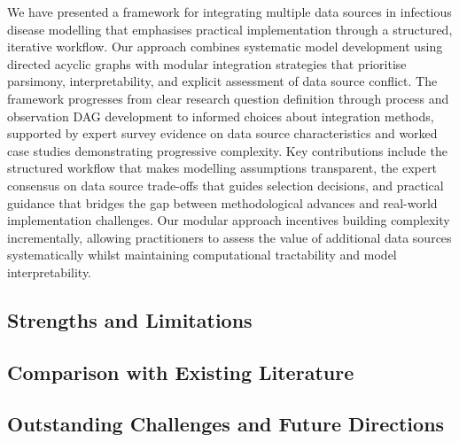 \documentclass{article}
\begin{document}
We have presented a framework for integrating multiple data sources in infectious disease modelling that emphasises practical implementation through a structured, iterative workflow.
Our approach combines systematic model development using directed acyclic graphs with modular integration strategies that prioritise parsimony, interpretability, and explicit assessment of data source conflict.
The framework progresses from clear research question definition through process and observation DAG development to informed choices about integration methods, supported by expert survey evidence on data source characteristics and worked case studies demonstrating progressive complexity.
Key contributions include the structured workflow that makes modelling assumptions transparent, the expert consensus on data source trade-offs that guides selection decisions, and practical guidance that bridges the gap between methodological advances and real-world implementation challenges.
Our modular approach incentives building complexity incrementally, allowing practitioners to assess the value of additional data sources systematically whilst maintaining computational tractability and model interpretability.

\subsection{Strengths and Limitations}

\subsection{Comparison with Existing Literature}

\subsection{Outstanding Challenges and Future Directions}
\end{document}
